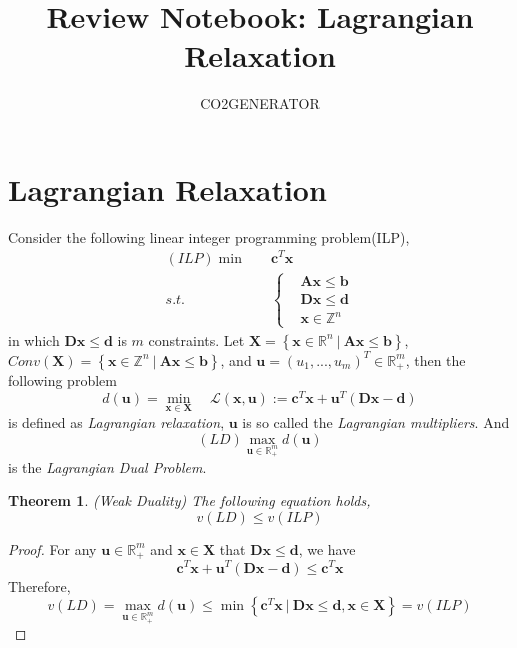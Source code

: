 \documentclass{article}
\title {Review Notebook: Lagrangian Relaxation}
\author{CO2GENERATOR}
\newtheorem{thm}{Theorem}
\begin{document}
\maketitle 
\allowdisplaybreaks[4]

\section{Lagrangian Relaxation}
 
Consider the following linear integer programming problem(ILP),
\begin{align}
	(\textit{ILP}) \min \quad & \bm{c}^T\bm{x} \\
	s.t. \quad & \left\{\begin{aligned}
	& \bm{A}\bm{x} \leq \bm{b} \\
	& \bm{D}\bm{x} \leq \bm{d} \\
	& \bm{x} \in \mathbb{Z}^n
	\end{aligned} \right.
\end{align}
in which $\bm{D} \bm{x} \leq \bm{d}$ is $m$ constraints. Let $\bm{X}= \left\{\bm{x} \in \mathbb{R}^n \ | \ \bm{A}\bm{x} \leq \bm{b}\right\}$, $Conv(\bm{X}) = \left\{\bm{x} \in \mathbb{Z}^n \ | \ \bm{A}\bm{x} \leq \bm{b}\right\}$, and $\bm{u} = (u_1, ..., u_m)^T \in \mathbb{R}_+^m$, then the following problem
\begin{equation}
	 d(\bm{u}) = \min_{\bm{x} \in \bm{X}} \quad \mathcal{L}(\bm{x}, \bm{u}) := \bm{c}^T\bm{x} + \bm{u}^T(\bm{D}\bm{x} - \bm{d}) 
\end{equation}
 is defined as \textit{Lagrangian relaxation}, $\bm{u}$ is so called the \textit{Lagrangian multipliers}. And 
 \begin{equation}
 	(\textit{LD}) \max_{\bm{u} \in \mathbb{R}_+^m}d(\bm{u})
 \end{equation}
 is the \textit{Lagrangian Dual Problem}.
 
 \begin{thm} 
 	(Weak Duality) The following equation holds,
 	\begin{equation}
 		v(LD) \leq v(ILP)
 	\end{equation}
 \end{thm}

\begin{proof}
	For any $\bm{u} \in \mathbb{R}_+^m$ and $\bm{x} \in \bm{X}$ that $\bm{Dx} \leq \bm{d}$, we have
	\begin{equation}
		\bm{c}^T \bm{x} + \bm{u}^T (\bm{Dx} - \bm{d}) \leq \bm{c}^T\bm{x}
	\end{equation}
	Therefore,
	\begin{equation}
		v(LD) = \max_{\bm{u} \in \mathbb{R}_+^m} d(\bm{u}) \leq \min \left\{\bm{c}^T\bm{x} \ | \ \bm{D}\bm{x} \leq \bm{d}, \bm{x} \in \bm{X}\right\} = v(ILP)
	\end{equation}
\end{proof}
\end{document}
